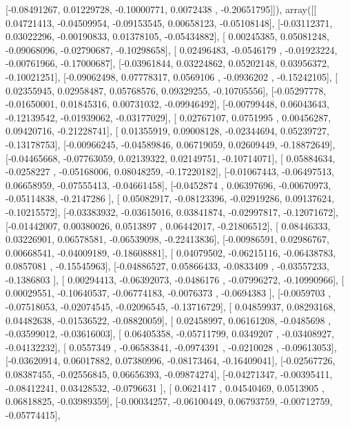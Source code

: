 \documentclass{article}
\begin{document}
       [-0.08491267,  0.01229728, -0.10000771,  0.0072438 , -0.20651795]]), array([[ 0.04721413, -0.04509954, -0.09153545,  0.00658123, -0.05108148],
       [-0.03112371,  0.03022296, -0.00190833,  0.01378105, -0.05434882],
       [ 0.00245385,  0.05081248, -0.09068096, -0.02790687, -0.10298658],
       [ 0.02496483, -0.0546179 , -0.01923224, -0.00761966, -0.17000687],
       [-0.03961844,  0.03224862,  0.05202148,  0.03956372, -0.10021251],
       [-0.09062498,  0.07778317,  0.0569106 , -0.0936202 , -0.15242105],
       [ 0.02355945,  0.02958487,  0.05768576,  0.09329255, -0.10705556],
       [-0.05297778, -0.01650001,  0.01845316,  0.00731032, -0.09946492],
       [-0.00799448,  0.06043643, -0.12139542, -0.01939062, -0.03177029],
       [ 0.02767107,  0.0751995 ,  0.00456287,  0.09420716, -0.21228741],
       [ 0.01355919,  0.09008128, -0.02344694,  0.05239727, -0.13178753],
       [-0.00966245, -0.04589846,  0.06719059,  0.02609449, -0.18872649],
       [-0.04465668, -0.07763059,  0.02139322,  0.02149751, -0.10714071],
       [ 0.05884634, -0.0258227 , -0.05168006,  0.08048259, -0.17220182],
       [-0.01067443, -0.06497513,  0.06658959, -0.07555413, -0.04661458],
       [-0.0452874 ,  0.06397696, -0.00670973, -0.05114838, -0.2147286 ],
       [ 0.05082917, -0.08123396, -0.02919286,  0.09137624, -0.10215572],
       [-0.03383932, -0.03615016,  0.03841874, -0.02997817, -0.12071672],
       [-0.01442007,  0.00380026,  0.0513897 ,  0.06442017, -0.21806512],
       [ 0.08446333,  0.03226901,  0.06578581, -0.06539098, -0.22413836],
       [-0.00986591,  0.02986767,  0.00668541, -0.04009189, -0.18608881],
       [ 0.04079502, -0.06215116, -0.06438783,  0.0857081 , -0.15545963],
       [-0.04886527,  0.05866433, -0.0833409 , -0.03557233, -0.1386803 ],
       [ 0.00294413, -0.06392073, -0.0486176 , -0.07996272, -0.10990966],
       [ 0.00029551, -0.10640537, -0.06774183, -0.0076373 , -0.0694383 ],
       [-0.0059703 , -0.07518053, -0.02074545, -0.02096545, -0.13716729],
       [ 0.04859937,  0.08293168,  0.04482638, -0.01536522, -0.08820059],
       [ 0.02458997,  0.06161208, -0.0485698 , -0.03599012, -0.03616003],
       [ 0.06405358, -0.05711799,  0.0349207 , -0.03408927, -0.04132232],
       [ 0.0557349 , -0.06583841, -0.0974391 , -0.0210028 , -0.09613053],
       [-0.03620914,  0.06017882,  0.07380996, -0.08173464, -0.16409041],
       [-0.02567726,  0.08387455, -0.02556845,  0.06656393, -0.09874274],
       [-0.04271347, -0.00395411, -0.08412241,  0.03428532, -0.0796631 ],
       [ 0.0621417 ,  0.04540469,  0.0513905 ,  0.06818825, -0.03989359],
       [-0.00034257, -0.06100449,  0.06793759, -0.00712759, -0.05774415],
\end{document}
